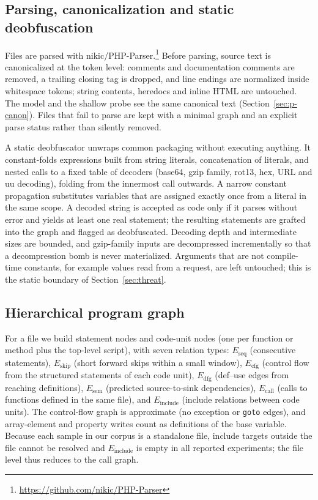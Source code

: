 \documentclass[pdflatex,sn-mathphys-num]{sn-jnl}
\begin{document}
\subsection{Parsing, canonicalization and static deobfuscation}\label{sec:parse}
Files are parsed with nikic/PHP-Parser.\footnote{\url{https://github.com/nikic/PHP-Parser}}
Before parsing, source text is canonicalized at the token level: comments and
documentation comments are removed, a trailing closing tag is dropped, and
line endings are normalized inside whitespace tokens; string contents,
heredocs and inline HTML are untouched. The model and the shallow probe see
the same canonical text (Section~\ref{sec:p-canon}). Files that fail to parse
are kept with a minimal graph and an explicit parse status rather than
silently removed.

A static deobfuscator unwraps common packaging without executing anything. It
constant-folds expressions built from string literals, concatenation of
literals, and nested calls to a fixed table of decoders (base64, gzip family,
rot13, hex, URL and uu decoding), folding from the innermost call outwards. A
narrow constant propagation substitutes variables that are assigned exactly
once from a literal in the same scope. A decoded string is accepted as code
only if it parses without error and yields at least one real statement; the
resulting statements are grafted into the graph and flagged as deobfuscated.
Decoding depth and intermediate sizes are bounded, and gzip-family inputs are
decompressed incrementally so that a decompression bomb is never materialized.
Arguments that are not compile-time constants, for example values read from a
request, are left untouched; this is the static boundary of
Section~\ref{sec:threat}.

\subsection{Hierarchical program graph}\label{sec:graph}
For a file we build statement nodes and code-unit nodes (one per function or
method plus the top-level script), with seven relation types:
$E_{\text{seq}}$ (consecutive statements), $E_{\text{skip}}$ (short forward
skips within a small window), $E_{\text{cfg}}$ (control flow from the
structured statements of each code unit), $E_{\text{dfg}}$ (def--use edges from
reaching definitions), $E_{\text{sem}}$ (predicted source-to-sink
dependencies), $E_{\text{call}}$ (calls to functions defined in the same file),
and $E_{\text{include}}$ (include relations between code units). The
control-flow graph is approximate (no exception or \texttt{goto} edges), and
array-element and property writes count as definitions of the base variable.
Because each sample in our corpus is a standalone file, include targets outside
the file cannot be resolved and $E_{\text{include}}$ is empty in all reported
experiments; the file level thus reduces to the call graph.
\end{document}
